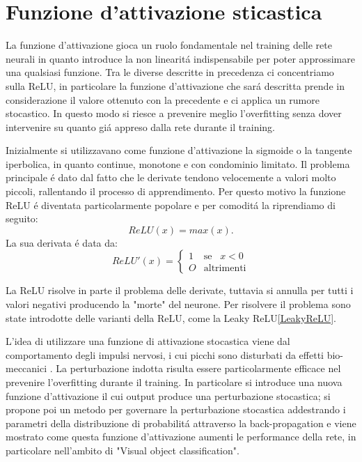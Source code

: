 \documentclass[a4paper,12pt]{report}
\begin{document}
 \section{Funzione d'attivazione sticastica}
 La funzione d'attivazione gioca un ruolo fondamentale nel training delle rete neurali in quanto introduce la non linearit\'a indispensabile per poter approssimare una qualsiasi funzione. 
 Tra le diverse descritte in precedenza ci concentriamo sulla ReLU, in particolare la funzione d'attivazione che sar\'a descritta prende in considerazione il valore ottenuto con la precedente e ci applica un rumore stocastico. 
 In questo modo si riesce a prevenire meglio l'overfitting senza dover intervenire su quanto gi\'a appreso dalla rete durante il training. 
 
 Inizialmente si utilizzavano come funzione d'attivazione la sigmoide o la tangente iperbolica, in quanto continue, monotone e con condominio limitato. 
 Il problema principale \'e dato dal fatto che le derivate tendono velocemente a valori molto piccoli, rallentando il processo di apprendimento. 
 Per questo motivo la funzione ReLU \'e diventata particolarmente popolare e per comodit\'a la riprendiamo di seguito:
 \begin{equation} 
  ReLU\left(x\right) = max\left(x\right). 
 \end{equation} 
 La sua derivata  \'e data da:
 \begin{equation} 
  ReLU'\left(x\right) = \begin{cases} 
     1 & \mbox{se} \;\;\; x < 0 \\
     O & \mbox{altrimenti} 
 \end{cases} 
 \end{equation} 

 La ReLU risolve in parte il problema delle derivate, tuttavia si annulla per tutti i valori negativi producendo la "morte" del neurone. 
 Per risolvere il problema sono state introdotte delle varianti della ReLU, come la Leaky ReLU\ref{LeakyReLU}. 
 
 L'idea di utilizzare una funzione di attivazione stocastica viene dal comportamento degli impulsi nervosi, i cui picchi sono disturbati da effetti bio-meccanici \cite{lewicki1998review}. 
 La perturbazione indotta risulta essere particolarmente efficace nel prevenire l'overfitting durante il training. 
 In particolare si introduce una nuova funzione d'attivazione il cui output produce una perturbazione stocastica; si propone poi un metodo per governare la perturbazione stocastica addestrando i parametri della distribuzione di probabilit\'a attraverso la back-propagation e viene mostrato come questa funzione d'attivazione aumenti le performance della rete, in particolare nell'ambito di "Visual object classification". 
 
\end{document}
